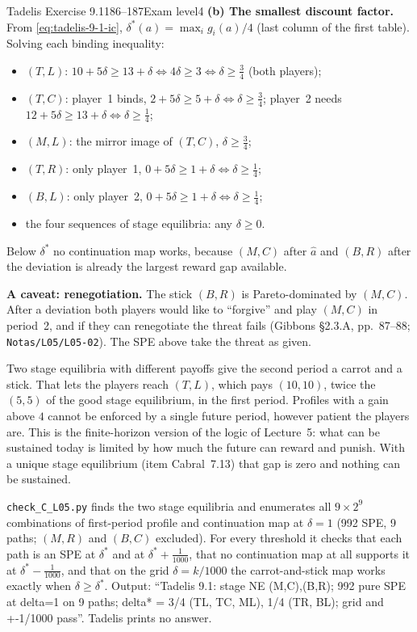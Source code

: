 \begin{exsol}{Tadelis Exercise 9.1}{186--187}{Exam level}{4}
\textbf{(b) The smallest discount factor.} From \eqref{eq:tadelis-9-1-ic},
$\delta^*(a) = \max_i g_i(a)/4$ (last column of the first table). Solving each binding inequality:
\begin{itemize}
  \item $(T,L)$: $10 + 5\delta \ge 13 + \delta \iff 4\delta \ge 3 \iff \delta \ge \frac34$ (both players);
  \item $(T,C)$: player~1 binds, $2 + 5\delta \ge 5 + \delta \iff \delta \ge \frac34$; player~2 needs
  $12 + 5\delta \ge 13 + \delta \iff \delta \ge \frac14$;
  \item $(M,L)$: the mirror image of $(T,C)$, $\delta \ge \frac34$;
  \item $(T,R)$: only player~1, $0 + 5\delta \ge 1 + \delta \iff \delta \ge \frac14$;
  \item $(B,L)$: only player~2, $0 + 5\delta \ge 1 + \delta \iff \delta \ge \frac14$;
  \item the four sequences of stage equilibria: any $\delta \ge 0$.
\end{itemize}
Below $\delta^*$ no continuation map works, because $(M,C)$ after $\hat a$ and $(B,R)$ after the
deviation is already the largest reward gap available.

\textbf{A caveat: renegotiation.} The stick $(B,R)$ is Pareto-dominated by $(M,C)$. After a
deviation both players would like to ``forgive'' and play $(M,C)$ in period~2, and if they can
renegotiate the threat fails (Gibbons \S2.3.A, pp.~87--88; \texttt{Notas/L05/L05-02}). The SPE
above take the threat as given.

\interp Two stage equilibria with different payoffs give the second period a carrot and a stick.
That lets the players reach $(T,L)$, which pays $(10,10)$, twice the $(5,5)$ of the good stage
equilibrium, in the first period. Profiles with a gain above $4$ cannot be enforced by a single
future period, however patient the players are. This is the finite-horizon version of the logic
of Lecture~5: what can be sustained today is limited by how much the future can reward and punish.
With a unique stage equilibrium (item Cabral~7.13) that gap is zero and nothing can be sustained.

\verify \texttt{check\_C\_L05.py} finds the two stage equilibria and enumerates all
$9 \times 2^9$ combinations of first-period profile and continuation map at $\delta = 1$ (992 SPE,
9 paths; $(M,R)$ and $(B,C)$ excluded). For every threshold it checks that each path is an SPE at
$\delta^*$ and at $\delta^* + \frac1{1000}$, that no continuation map at all supports it at $\delta^* -
\frac1{1000}$, and that on the grid $\delta = k/1000$ the carrot-and-stick map works exactly when
$\delta \ge \delta^*$. Output: ``Tadelis 9.1: stage NE (M,C),(B,R); 992 pure SPE at delta=1 on 9 paths;
delta* = 3/4 (TL, TC, ML), 1/4 (TR, BL); grid and +-1/1000 pass''. Tadelis prints no answer.


\end{exsol}

